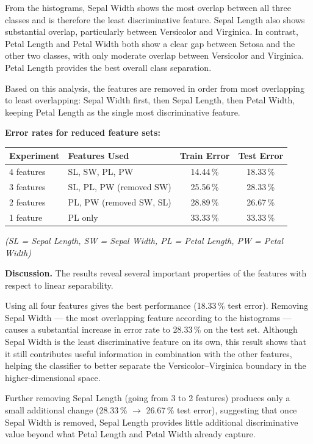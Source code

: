 \documentclass[11pt,a4paper]{article}
\begin{document}
From the histograms, Sepal Width shows the most overlap between all three classes and is therefore the least discriminative feature. Sepal Length also shows substantial overlap, particularly between Versicolor and Virginica. In contrast, Petal Length and Petal Width both show a clear gap between Setosa and the other two classes, with only moderate overlap between Versicolor and Virginica. Petal Length provides the best overall class separation.

Based on this analysis, the features are removed in order from most overlapping to least overlapping: Sepal Width first, then Sepal Length, then Petal Width, keeping Petal Length as the single most discriminative feature.

\bigskip
\noindent\textbf{Error rates for reduced feature sets:}
\begin{center}
\begin{tabular}{llcc}
\toprule
Experiment & Features Used & Train Error & Test Error \\
\midrule
4 features & SL, SW, PL, PW & 14.44\,\% & 18.33\,\% \\
3 features & SL, PL, PW (removed SW) & 25.56\,\% & 28.33\,\% \\
2 features & PL, PW (removed SW, SL) & 28.89\,\% & 26.67\,\% \\
1 feature  & PL only & 33.33\,\% & 33.33\,\% \\
\bottomrule
\end{tabular}
\end{center}
\textit{(SL = Sepal Length, SW = Sepal Width, PL = Petal Length, PW = Petal Width)}

\bigskip
\textbf{Discussion.} The results reveal several important properties of the features with respect to linear separability.

Using all four features gives the best performance (18.33\,\% test error). Removing Sepal Width --- the most overlapping feature according to the histograms --- causes a substantial increase in error rate to 28.33\,\% on the test set. Although Sepal Width is the least discriminative feature on its own, this result shows that it still contributes useful information in combination with the other features, helping the classifier to better separate the Versicolor--Virginica boundary in the higher-dimensional space.

Further removing Sepal Length (going from 3 to 2 features) produces only a small additional change (28.33\,\% $\rightarrow$ 26.67\,\% test error), suggesting that once Sepal Width is removed, Sepal Length provides little additional discriminative value beyond what Petal Length and Petal Width already capture.
\end{document}
